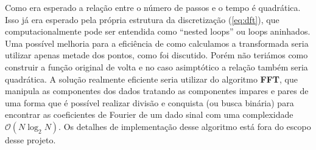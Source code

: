 \documentclass[a4paper, 11pt]{article}
\begin{document}
Como era esperado a relação entre o número de passos e o tempo é quadrática. Isso já era esperado
pela própria estrutura da discretização (\ref{eq:dft}), que computacionalmente pode ser entendida
como ``nested loops'' ou loops aninhados. Uma possível melhoria para a eficiência de como calculamos
a transformada seria utilizar apenas metade dos pontos, como foi discutido. Porém não teriámos como
construir a função original de volta e no caso asimptótico a relação também seria quadrática.
A solução realmente eficiente seria utilizar do algoritmo {\bfseries FFT}, que manipula as
componentes dos dados tratando as componentes impares e pares de uma forma que é possível realizar
divisão e conquista (ou busca binária) para encontrar as coeficientes de Fourier de um dado
sinal com uma complexidade $\mathcal{O}(N \log_2 N)$. Os detalhes de implementação desse algoritmo está fora
do escopo desse projeto.
\end{document}
